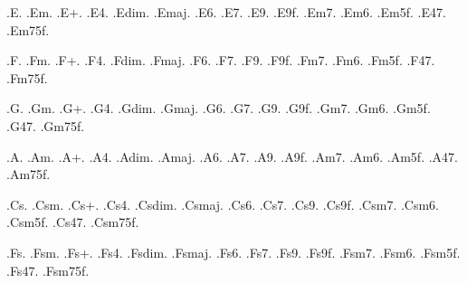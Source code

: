 %
%
.E.{}
.Em.{}
.E+.{}
.E4.{}
.Edim.{}
.Emaj.{}
.E6.{}
.E7.{}
.E9.{}
.E9f.{}
.Em7.{}
.Em6.{}
.Em5f.{}
.E47.{}
.Em75f.{}

%
%
.F.{}
.Fm.{}
.F+.{}
.F4.{}
.Fdim.{}
.Fmaj.{}
.F6.{}
.F7.{}
.F9.{}
.F9f.{}
.Fm7.{}
.Fm6.{}
.Fm5f.{}
.F47.{}
.Fm75f.{}

%
%
.G.{}
.Gm.{}
.G+.{}
.G4.{}
.Gdim.{}
.Gmaj.{}
.G6.{}
.G7.{}
.G9.{}
.G9f.{}
.Gm7.{}
.Gm6.{}
.Gm5f.{}
.G47.{}
.Gm75f.{}

%
%
.A.{}
.Am.{}
.A+.{}
.A4.{}
.Adim.{}
.Amaj.{}
.A6.{}
.A7.{}
.A9.{}
.A9f.{}
.Am7.{}
.Am6.{}
.Am5f.{}
.A47.{}
.Am75f.{}

%
%
.Cs.{}
.Csm.{}
.Cs+.{}
.Cs4.{}
.Csdim.{}
.Csmaj.{}
.Cs6.{}
.Cs7.{}
.Cs9.{}
.Cs9f.{}
.Csm7.{}
.Csm6.{}
.Csm5f.{}
.Cs47.{}
.Csm75f.{}

%
%
.Fs.{}
.Fsm.{}
.Fs+.{}
.Fs4.{}
.Fsdim.{}
.Fsmaj.{}
.Fs6.{}
.Fs7.{}
.Fs9.{}
.Fs9f.{}
.Fsm7.{}
.Fsm6.{}
.Fsm5f.{}
.Fs47.{}
.Fsm75f.{}

